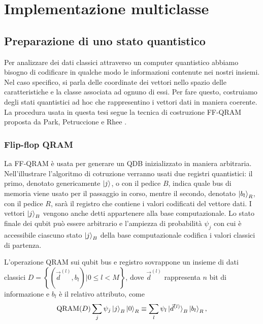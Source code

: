 \chapter{Implementazione multiclasse}\label{ch:implementazione}

\section{Preparazione di uno stato quantistico}

Per analizzare dei dati classici attraverso un computer quantistico 
abbiamo bisogno di codificare in qualche modo le informazioni 
contenute nei nostri insiemi. Nel caso specifico, si parla delle 
coordinate dei vettori nello spazio delle caratteristiche e la 
classe associata ad ognuno di essi. 
Per fare questo, costruiamo degli stati quantistici 
ad hoc che rappresentino i vettori dati in maniera coerente. 
La procedura usata in questa tesi segue la tecnica di costruzione 
\ac{FF-QRAM} proposta da Park, Petruccione e Rhee \cite{petruccione}. 

\subsection{Flip-flop QRAM} \label{sec:ff-qram}

La \ac{FF-QRAM} è usata per generare un \ac{QDB} inizializzato in maniera arbitraria. 
Nell'illustrare l'algoritmo di cotruzione verranno usati due registri quantistici: 
il primo, denotato genericamente $\ket{j}$, o con il pedice $B$, indica quale bus 
di memoria viene usato per il passaggio in corso, mentre il secondo, denotato 
$\ket{b_l}_R$, con il pedice $R$, sarà il registro che contiene i 
valori codificati del vettore dati. 
I vettori $\ket{j}_B$ vengono anche detti appartenere alla base computazionale. 
Lo stato finale dei qubit può essere 
arbitrario e l'ampiezza di probabilità $\psi_j$ con cui è accessibile ciascuno stato 
$\ket{j}_B$ della base computazionale codifica i valori classici di partenza. 

L'operazione QRAM sui qubit bus e registro sovrappone un insieme di dati classici 
$D = \left\{ \left( \vec{d}^{(l)}, b_l \right) | 0 \leq l < M \right\}$, dove 
$\vec{d}^{(l)}$ rappresenta $n$ bit di informazione e $b_l$ è il relativo attributo, come 
\begin{equation} \label{eq:qram}
    \text{QRAM}(D) \sum_j \psi_j \ket{j}_B \ket{0}_R \equiv 
    \sum_l \psi_l \ket{\vec{d}^{(l)}}_B \ket{b_l}_R,
\end{equation}

